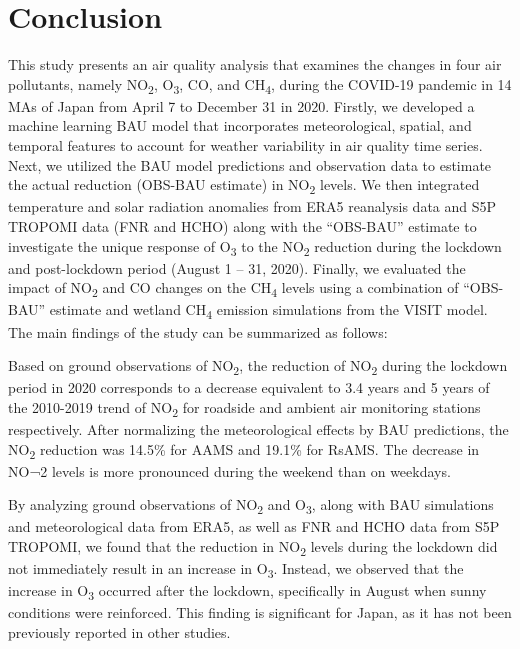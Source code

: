 \section{Conclusion} \label{chap4_conclusion}
This study presents an air quality analysis that examines the changes in four air pollutants, namely NO\textsubscript{2}, O\textsubscript{3}, CO, and CH\textsubscript{4}, during the COVID-19 pandemic in 14 MAs of Japan from April 7 to December 31 in 2020. Firstly, we developed a machine learning BAU model that incorporates meteorological, spatial, and temporal features to account for weather variability in air quality time series. Next, we utilized the BAU model predictions and observation data to estimate the actual reduction (OBS-BAU estimate) in NO\textsubscript{2} levels. We then integrated temperature and solar radiation anomalies from ERA5 reanalysis data and S5P TROPOMI data (FNR and HCHO) along with the “OBS-BAU” estimate to investigate the unique response of O\textsubscript{3} to the NO\textsubscript{2} reduction during the lockdown and post-lockdown period (August 1 – 31, 2020). Finally, we evaluated the impact of NO\textsubscript{2} and CO changes on the CH\textsubscript{4} levels using a combination of “OBS-BAU” estimate and wetland CH\textsubscript{4} emission simulations from the VISIT model. The main findings of the study can be summarized as follows:\par
Based on ground observations of NO\textsubscript{2}, the reduction of NO\textsubscript{2} during the lockdown period in 2020 corresponds to a decrease equivalent to 3.4 years and 5 years of the 2010-2019 trend of NO\textsubscript{2} for roadside and ambient air monitoring stations respectively. After normalizing the meteorological effects by BAU predictions, the NO\textsubscript{2} reduction was 14.5\% for AAMS and 19.1\% for RsAMS. The decrease in NO¬2 levels is more pronounced during the weekend than on weekdays.\par
By analyzing ground observations of NO\textsubscript{2} and O\textsubscript{3}, along with BAU simulations and meteorological data from ERA5, as well as FNR and HCHO data from S5P TROPOMI, we found that the reduction in NO\textsubscript{2} levels during the lockdown did not immediately result in an increase in O\textsubscript{3}. Instead, we observed that the increase in O\textsubscript{3} occurred after the lockdown, specifically in August when sunny conditions were reinforced. This finding is significant for Japan, as it has not been previously reported in other studies.\par
